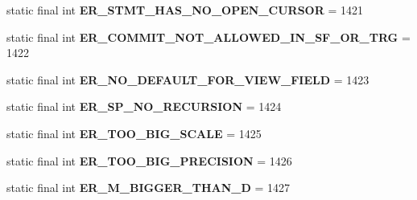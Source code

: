 \begin{DoxyCompactItemize}
\item 
\mbox{\label{classcom_1_1mysql_1_1cj_1_1exceptions_1_1_mysql_error_numbers_a2ad73d8953326f15a01682ab57d475d2}} 
static final int {\bfseries E\+R\+\_\+\+S\+T\+M\+T\+\_\+\+H\+A\+S\+\_\+\+N\+O\+\_\+\+O\+P\+E\+N\+\_\+\+C\+U\+R\+S\+OR} = 1421
\item 
\mbox{\label{classcom_1_1mysql_1_1cj_1_1exceptions_1_1_mysql_error_numbers_a4892ca595986b90f6c7f6b772a7c23ce}} 
static final int {\bfseries E\+R\+\_\+\+C\+O\+M\+M\+I\+T\+\_\+\+N\+O\+T\+\_\+\+A\+L\+L\+O\+W\+E\+D\+\_\+\+I\+N\+\_\+\+S\+F\+\_\+\+O\+R\+\_\+\+T\+RG} = 1422
\item 
\mbox{\label{classcom_1_1mysql_1_1cj_1_1exceptions_1_1_mysql_error_numbers_a1f8d704b28758cf965cb5eca3673af04}} 
static final int {\bfseries E\+R\+\_\+\+N\+O\+\_\+\+D\+E\+F\+A\+U\+L\+T\+\_\+\+F\+O\+R\+\_\+\+V\+I\+E\+W\+\_\+\+F\+I\+E\+LD} = 1423
\item 
\mbox{\label{classcom_1_1mysql_1_1cj_1_1exceptions_1_1_mysql_error_numbers_a86dadf538ffb5e3535bdc44295be0c28}} 
static final int {\bfseries E\+R\+\_\+\+S\+P\+\_\+\+N\+O\+\_\+\+R\+E\+C\+U\+R\+S\+I\+ON} = 1424
\item 
\mbox{\label{classcom_1_1mysql_1_1cj_1_1exceptions_1_1_mysql_error_numbers_a3f42c69750e8105649925f98647f6472}} 
static final int {\bfseries E\+R\+\_\+\+T\+O\+O\+\_\+\+B\+I\+G\+\_\+\+S\+C\+A\+LE} = 1425
\item 
\mbox{\label{classcom_1_1mysql_1_1cj_1_1exceptions_1_1_mysql_error_numbers_a5f74ba6070f63ff7b948ff62e62aa6e9}} 
static final int {\bfseries E\+R\+\_\+\+T\+O\+O\+\_\+\+B\+I\+G\+\_\+\+P\+R\+E\+C\+I\+S\+I\+ON} = 1426
\item 
\mbox{\label{classcom_1_1mysql_1_1cj_1_1exceptions_1_1_mysql_error_numbers_a6c4e62989e3f99a8043751550e11e974}} 
static final int {\bfseries E\+R\+\_\+\+M\+\_\+\+B\+I\+G\+G\+E\+R\+\_\+\+T\+H\+A\+N\+\_\+D} = 1427

\end{DoxyCompactItemize}
